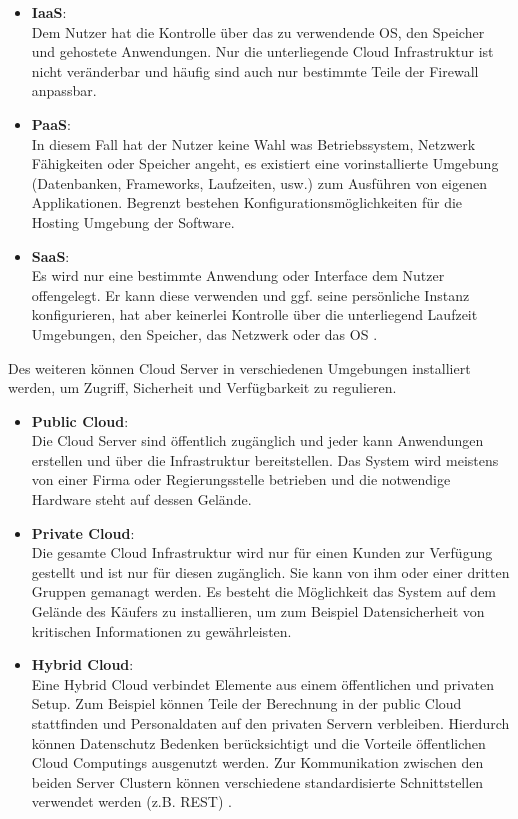 \begin{itemize}
	\item \textbf{IaaS}:\\
	Dem Nutzer hat die Kontrolle über das zu verwendende OS, den Speicher und gehostete Anwendungen. Nur die unterliegende Cloud Infrastruktur ist nicht veränderbar und häufig sind auch nur bestimmte Teile der Firewall anpassbar.
	\item \textbf{PaaS}:\\
	In diesem Fall hat der Nutzer keine Wahl was Betriebssystem, Netzwerk Fähigkeiten oder Speicher angeht, es existiert eine vorinstallierte Umgebung (Datenbanken, Frameworks, Laufzeiten, usw.) zum Ausführen von eigenen Applikationen. Begrenzt bestehen Konfigurationsmöglichkeiten für die Hosting Umgebung der Software. 
	\item \textbf{SaaS}:\\
	Es wird nur eine bestimmte Anwendung oder Interface dem Nutzer offengelegt. Er kann diese verwenden und ggf. seine persönliche Instanz konfigurieren, hat aber keinerlei Kontrolle über die unterliegend Laufzeit Umgebungen, den Speicher, das Netzwerk oder das OS \parencite[S. 15f]{rafaels.2015}.
\end{itemize}

Des weiteren können Cloud Server in verschiedenen Umgebungen installiert werden, um Zugriff, Sicherheit und Verfügbarkeit zu regulieren.

\begin{itemize}
	\item \textbf{Public Cloud}:\\
	Die Cloud Server sind öffentlich zugänglich und jeder kann Anwendungen erstellen und über die Infrastruktur bereitstellen. Das System wird meistens von einer Firma oder Regierungsstelle betrieben und die notwendige Hardware steht auf dessen Gelände. 
	\item \textbf{Private Cloud}:\\
	Die gesamte Cloud Infrastruktur wird nur für einen Kunden zur Verfügung gestellt und ist nur für diesen zugänglich. Sie kann von ihm oder einer dritten Gruppen gemanagt werden. Es besteht die Möglichkeit das System auf dem Gelände des Käufers zu installieren, um zum Beispiel Datensicherheit von kritischen Informationen zu gewährleisten. 
	\item \textbf{Hybrid Cloud}:\\
	Eine Hybrid Cloud verbindet Elemente aus einem öffentlichen und privaten Setup. Zum Beispiel können Teile der Berechnung in der public Cloud stattfinden und Personaldaten auf den privaten Servern verbleiben. Hierdurch können Datenschutz Bedenken berücksichtigt und die Vorteile öffentlichen Cloud Computings ausgenutzt werden. Zur Kommunikation zwischen den beiden Server Clustern können verschiedene standardisierte Schnittstellen verwendet werden (z.B. REST)  \parencite{rafaels.2015}.
\end{itemize}

